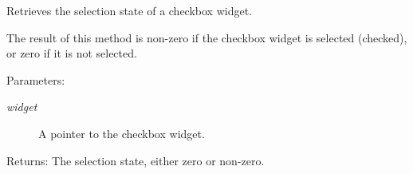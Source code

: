 Retrieves the selection state of a checkbox widget. 

The result of this method is non-zero if the checkbox widget is selected (checked), or zero if it is not selected.

\begin{Desc}
\item[Parameters:]
\begin{description}
\item[{\em widget}]A pointer to the checkbox widget. \end{description}
\end{Desc}
\begin{Desc}
\item[Returns:]The selection state, either zero or non-zero. \end{Desc}
